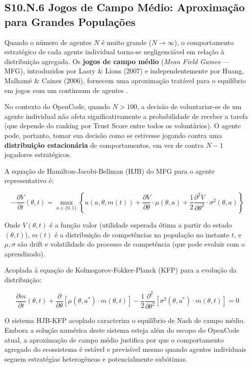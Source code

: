\subsection*{S10.N.6 Jogos de Campo Médio: Aproximação para Grandes Populações}

Quando o número de agentes $N$ é muito grande ($N \to \infty$), o comportamento estratégico de cada agente individual torna-se negligenciável em relação à distribuição agregada. Os \textbf{jogos de campo médio} (\textit{Mean Field Games} --- MFG), introduzidos por Lasry \& Lions (2007) e independentemente por Huang, Malhamé \& Caines (2006), fornecem uma aproximação tratável para o equilíbrio em jogos com um continuum de agentes \cite{lasry2007mean}.

No contexto do OpenCode, quando $N > 100$, a decisão de voluntariar-se de um agente individual não afeta significativamente a probabilidade de receber a tarefa (que depende do ranking por Trust Score entre todos os voluntários). O agente pode, portanto, tomar sua decisão como se estivesse jogando contra uma \textbf{distribuição estacionária} de comportamentos, em vez de contra $N-1$ jogadores estratégicos.

A equação de Hamilton-Jacobi-Bellman (HJB) do MFG para o agente representativo é:

\begin{equation}\label{eq:mfg_hjb}
-\frac{\partial V}{\partial t}(\theta, t) = \max_{a \in \{0,1\}} \left\{u(a, \theta, m(t)) + \frac{\partial V}{\partial \theta} \cdot \mu(\theta, a) + \frac{1}{2}\frac{\partial^2 V}{\partial \theta^2} \cdot \sigma^2(\theta, a)\right\}
\end{equation}

Onde $V(\theta, t)$ é a função valor (utilidade esperada ótima a partir do estado $(\theta, t)$), $m(t)$ é a distribuição de competências na população no instante $t$, e $\mu, \sigma$ são drift e volatilidade do processo de competência (que pode evoluir com o aprendizado).

Acoplada à equação de Kolmogorov-Fokker-Planck (KFP) para a evolução da distribuição:

\begin{equation}\label{eq:mfg_kfp}
\frac{\partial m}{\partial t}(\theta, t) + \frac{\partial}{\partial \theta}[\mu(\theta, a^*) \cdot m(\theta, t)] - \frac{1}{2}\frac{\partial^2}{\partial \theta^2}[\sigma^2(\theta, a^*) \cdot m(\theta, t)] = 0
\end{equation}

O sistema HJB-KFP acoplado caracteriza o equilíbrio de Nash de campo médio. Embora a solução numérica deste sistema esteja além do escopo do OpenCode atual, a aproximação de campo médio justifica por que o comportamento agregado do ecossistema é estável e previsível mesmo quando agentes individuais seguem estratégias heterogêneas e potencialmente subótimas.

